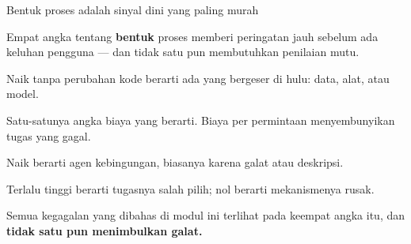 \documentclass[aspectratio=169,11pt,t]{beamer}
\begin{document}
\begin{frame}[shrink=25]{Bentuk proses adalah sinyal dini yang paling murah}
{\fontsize{9.4}{12.6}\selectfont\color{fg2}Empat angka tentang \textbf{bentuk} proses memberi peringatan jauh sebelum ada keluhan pengguna --- dan tidak satu pun membutuhkan penilaian mutu.\par}\vskip 4pt
\begin{minipage}[t]{0.494\textwidth}
\begin{icard}
Naik tanpa perubahan kode berarti ada yang bergeser di hulu: data, alat, atau model.
\end{icard}
\end{minipage}%
\hfill
\begin{minipage}[t]{0.494\textwidth}
\begin{icard}
Satu-satunya angka biaya yang berarti. Biaya per permintaan menyembunyikan tugas yang gagal.
\end{icard}
\end{minipage}%


\vskip 4pt

\begin{minipage}[t]{0.494\textwidth}
\begin{icard}
Naik berarti agen kebingungan, biasanya karena galat atau deskripsi.
\end{icard}
\end{minipage}%
\hfill
\begin{minipage}[t]{0.494\textwidth}
\begin{icard}
Terlalu tinggi berarti tugasnya salah pilih; nol berarti mekanismenya rusak.
\end{icard}
\end{minipage}%
{\fontsize{9.4}{12.6}\selectfont\color{fg2}Semua kegagalan yang dibahas di modul ini terlihat pada keempat angka itu, dan \textbf{tidak satu pun menimbulkan galat.}\par}\vskip 4pt
\end{frame}
\end{document}

